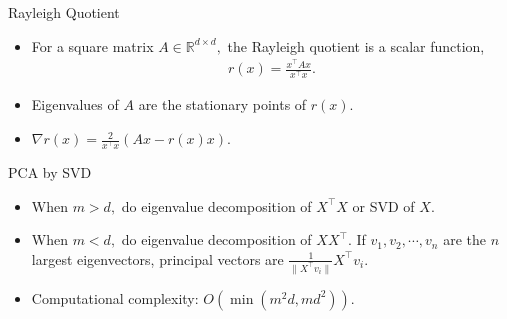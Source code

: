 \documentclass[final]{beamer}
\begin{document}
\begin{frame}{Rayleigh Quotient}
\begin{itemize}
	\item For a square matrix $A \in \mathbb{R}^{d\times d},$ the Rayleigh quotient is a scalar function,
	\begin{align*}
		r(x) = \frac{x^\top A x}{x^\top x}.
	\end{align*}
	\pause
	\item Eigenvalues of $A$ are the stationary points of $r(x)$.
	\pause
	\item $\nabla r(x) = \frac{2}{x^\top x} (Ax - r(x)x)$.
\end{itemize}
\end{frame}
\begin{frame}{PCA by SVD}
	\begin{itemize}
		\item When $m > d,$ do eigenvalue decomposition of $X^\top X$ or SVD of $X$.
		\pause
		\item When $m < d,$ do eigenvalue decomposition of $XX^\top.$ If $v_1, v_2,\cdots, v_n$ are the $n$ largest eigenvectors, principal vectors are $\frac{1}{\|X^\top v_i\|} X^\top v_i$.
		\pause
		\item Computational complexity: $O(\min(m^2d, md^2))$.

	\end{itemize}

\end{frame}
\end{document}
